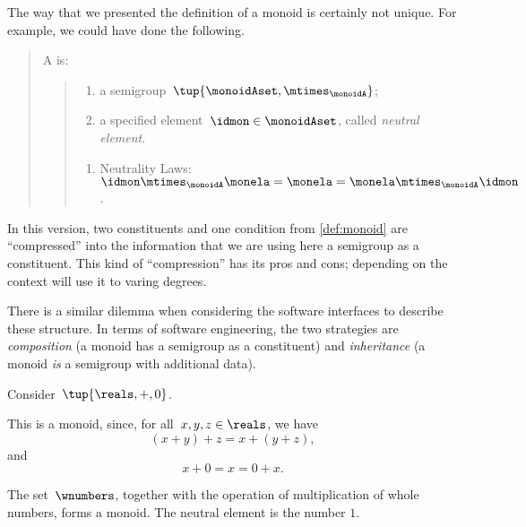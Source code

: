 \begin{remark}
  The way that we presented the definition of a monoid is certainly not unique. For example, we could have done the following.

  \begin{quote}
    A \emph{} is:
    \begin{quote}
      \constit
      \begin{enumerate}
        \item a semigroup~$\tup{\monoidAset, \mtimes_{\monoidA}}$;
        \item a specified element~$\idmon\in \monoidAset$, called \emph{neutral element}.
      \end{enumerate}
      \condit
      \begin{enumerate}
        \item Neutrality Laws:~$\idmon\mtimes_\monoidA  \monela= \monela= \monela \mtimes_\monoidA \idmon$.
      \end{enumerate}
    \end{quote}
  \end{quote}
  In this version, two constituents and one condition from \cref{def:monoid} are ``compressed'' into the information that we are using here a semigroup as a constituent. This kind of ``compression'' has its pros and cons; depending on the context will use it to varing degrees.

  There is a similar dilemma when considering the software interfaces to describe these structure.
  In terms of software engineering, the two strategies are \emph{composition} (a monoid has a semigroup as a constituent)
  and \emph{inheritance} (a monoid \emph{is} a semigroup with additional data).

\end{remark}



\begin{example}
  Consider~$\tup{\reals,+,0}$.

  This is a monoid, since, for all~$x,y, z \in \reals$, we have
  \begin{equation*}
  (x+y)
    +z=x+(y+z),
  \end{equation*}
  and
  \begin{equation*}
    x+0=x=0+x.
  \end{equation*}
\end{example}

\begin{example}
  The set~$\wnumbers$, together with the operation of multiplication of whole numbers, forms a monoid. The neutral element is the number $1$.
\end{example}

